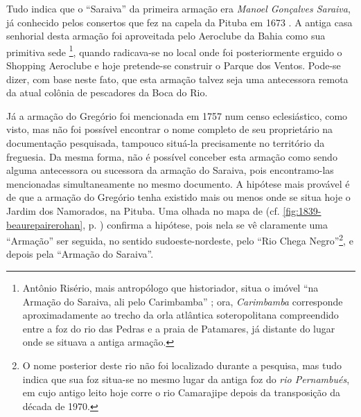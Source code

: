 Tudo indica que o ``Saraiva'' da primeira armação era \textit{Manoel Gonçalves Saraiva}, já conhecido pelos consertos que fez na capela da Pituba em 1673 \cite[p.~11]{ott_engenhos_1996}. A antiga casa senhorial desta armação foi aproveitada pelo Aeroclube da Bahia como sua primitiva sede \cite[p.~III-11, verso]{teixeira_doacoes_1978}\footnote{Antônio Risério, mais antropólogo que historiador, situa o imóvel ``na Armação do Saraiva, ali pelo Carimbamba'' \cite{riserio_histba_2004}; ora, \textit{Carimbamba} corresponde aproximadamente ao trecho da orla atlântica soteropolitana compreendido entre a foz do rio das Pedras e a praia de Patamares, já distante do lugar onde se situava a antiga armação.}, quando radicava-se no local onde foi posteriormente erguido o Shopping Aeroclube e hoje pretende-se construir o Parque dos Ventos. Pode-se dizer, com base neste fato, que esta armação talvez seja uma antecessora remota da atual colônia de pescadores da Boca do Rio.

Já a armação do Gregório foi mencionada em 1757 num censo eclesiástico, como visto, mas não foi possível encontrar o nome completo de seu proprietário na documentação pesquisada, tampouco situá-la precisamente no território da freguesia. Da mesma forma, não é possível conceber esta armação como sendo alguma antecessora ou sucessora da armação do Saraiva, pois encontramo-las mencionadas simultaneamente no mesmo documento. A hipótese mais provável é de que a armação do Gregório tenha existido mais ou menos onde se situa hoje o Jardim dos Namorados, na Pituba. Uma olhada no mapa de  (cf. \autoref{fig:1839-beaurepairerohan}, p. \pageref{fig:1839-beaurepairerohan}) confirma a hipótese, pois nela se vê claramente uma ``Armação'' ser seguida, no sentido sudoeste-nordeste, pelo ``Rio Chega Negro''\footnote{O nome posterior deste rio não foi localizado durante a pesquisa, mas tudo indica que sua foz situa-se no mesmo lugar da antiga foz do \textit{rio Pernambués}, em cujo antigo leito hoje corre o rio Camarajipe depois da transposição da década de 1970.}, e depois pela ``Armação do Saraiva''.



